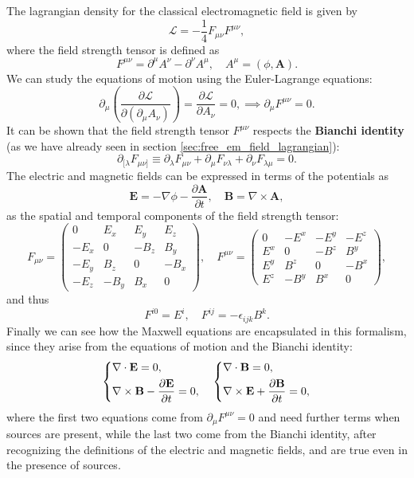 The lagrangian density for the classical electromagnetic field is given by
\[
    \mathcal{L} = -\frac{1}{4} F_{\mu\nu} F^{\mu\nu},
\]
where the field strength tensor is defined as
\[
    F^{\mu \nu} = \partial^\mu A^\nu - \partial^\nu A^\mu, \quad A^\mu = ( \phi, \mathbf{A} ).
\]
We can study the equations of motion using the Euler-Lagrange equations:
\[
    \partial_\mu \left( \frac{\partial \mathcal{L}}{\partial (\partial_\mu A_\nu)} \right) = \frac{\partial \mathcal{L}}{\partial A_\nu} = 0, \implies \partial_\mu F^{\mu \nu} = 0.
\]
It can be shown that the field strength tensor \(F^{\mu \nu}\) respects the \textbf{Bianchi identity} (as we have already seen in section \ref{sec:free_em_field_lagrangian}):
\[
    \partial_{[\lambda}F_{\mu\nu]} \equiv
    \partial_\lambda F_{\mu\nu} +
    \partial_\mu F_{\nu\lambda} +
    \partial_\nu F_{\lambda\mu} = 0.
\]
The electric and magnetic fields can be expressed in terms of the potentials as
\[
    \mathbf{E} = -\nabla \phi - \frac{\partial \mathbf{A}}{\partial t}, \quad \mathbf{B} = \nabla \times \mathbf{A},
\]
as the spatial and temporal components of the field strength tensor:
\begin{equation}
    F_{\mu \nu} = \begin{pmatrix}
        0    & E_x  & E_y  & E_z  \\
        -E_x & 0    & -B_z & B_y  \\
        -E_y & B_z  & 0    & -B_x \\
        -E_z & -B_y & B_x  & 0
    \end{pmatrix}, \quad F^{\mu \nu} = \begin{pmatrix}
        0   & -E^x & -E^y & -E^z \\
        E^x & 0    & -B^z & B^y  \\
        E^y & B^z  & 0    & -B^x \\
        E^z & -B^y & B^x  & 0
    \end{pmatrix},
    \label{eq:field_strength_tensor_components_explicit}
\end{equation}
and thus
\[
    F^{i0} = E^i, \quad F^{ij} = - \epsilon_{ijk}B^k.
\]
Finally we can see how the Maxwell equations are encapsulated in this formalism, since they arise from the equations of motion and the Bianchi identity:
\[
    \begin{dcases}
        \nabla \cdot \mathbf{E} = 0, \\
        \nabla \times \mathbf{B} - \frac{\partial \mathbf{E}}{\partial t} = 0,
    \end{dcases} \quad
    \begin{dcases}
        \nabla \cdot \mathbf{B} = 0, \\
        \nabla \times \mathbf{E} + \frac{\partial \mathbf{B}}{\partial t} = 0,
    \end{dcases}
\]
where the first two equations come from \(\partial_\mu F^{\mu \nu} = 0\) and need further terms when sources are present, while the last two come from the Bianchi identity, after recognizing the definitions of the electric and magnetic fields, and are true even in the presence of sources.

